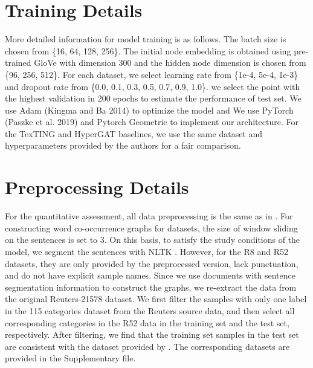 \documentclass[letterpaper]{article} %
\begin{document}
\section{Training Details}
More detailed information for model training is as follows. The batch size is chosen from \{16, 64, 128, 256\}. The initial node embedding is obtained using  pre-trained GloVe \cite{pennington2014glove} with dimension 300 and the hidden node dimension is chosen from \{96, 256, 512\}.  For each dataset, we select learning rate from \{1e-4, 5e-4, 1e-3\} and dropout rate from \{0.0, 0.1, 0.3, 0.5, 0.7, 0.9, 1.0\}. we select the point with the highest validation in 200 epochs to estimate the performance of test set. We use Adam (Kingma and Ba 2014) to optimize the model and We use PyTorch (Paszke et al. 2019) and Pytorch Geometric \cite{fey2019fast} to implement our architecture. For the TexTING \cite{zhang2020every} and HyperGAT \cite{ding2020more} baselines, we use the same dataset and hyperparameters provided by the authors for a fair comparison.

\section{Preprocessing Details}
For the quantitative assessment, all data preprocessing is the same as in \cite{kim-2014-convolutional, yao2019graph}. For constructing word co-occurrence graphs for datasets, the size of window sliding on the sentences is set to 3. On this basis, to satisfy the study conditions of the model, we segment the sentences with NLTK \cite{bird2006nltk}.
However, for the R8 and R52 datasets, they are only provided by the preprocessed version, lack punctuation, and do not have explicit sample names. Since we use documents with sentence segmentation information to construct the graphs, we re-extract the data from the original Reuters-21578 dataset. We first filter the samples with only one label in the 115 categories dataset from the Reuters source data, and then select all corresponding categories in the R52 data in the training set and the test set, respectively. After filtering, we find that the training set samples in the test set are consistent with the dataset provided by \cite{yao2019graph}. The corresponding datasets are provided in the Supplementary file.
\end{document}
